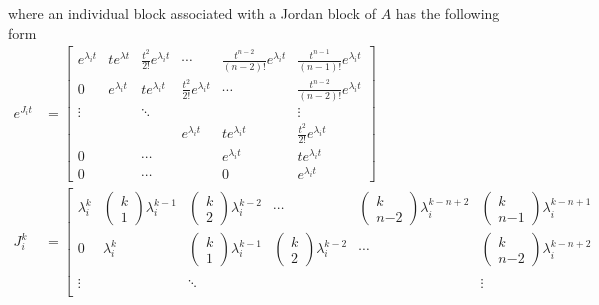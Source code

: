 \documentclass[twoside]{article}
\begin{document}
%
where an individual block associated with a Jordan block of $A$ has the following form
%
\begin{align*}
e^{J_i t} &= \left[  \begin{array}{cccccc} e^{\lambda_i t} & t e^{\lambda t} & \frac{t^2}{2 !} e^{\lambda_i t} 
& \cdots & \frac{t^{n-2}}{(n-2) !} e^{\lambda_i t}  & \frac{t^{n-1}}{(n-1) !} e^{\lambda_i t}
\\ 0 & e^{\lambda_i t} & t e^{\lambda_i t} & \frac{t^2}{2 !} e^{\lambda_i t} & \cdots  & \frac{t^{n-2}}{(n-2) !} e^{\lambda_i t}
\\  \vdots &  & \ddots &  &  & \vdots \\ 
& & & e^{\lambda_i t} & t e^{\lambda_i t} & \frac{t^2}{2 !} e^{\lambda_i t}
\\ 0 &  & \cdots  &  & e^{\lambda_i t} & t e^{\lambda_i t} \\
0 &  & \cdots &  & 0 & e^{\lambda_i t} \end{array} \right] 
\\
J_i^k &= \left[  \begin{array}{cccccc} \lambda_i^k & \begin{pmatrix} k \\ 1 \end{pmatrix} \lambda_i^{k-1} & \begin{pmatrix} k \\ 2 \end{pmatrix}  \lambda_i^{k-2} 
& \cdots & \begin{pmatrix} k \\ n\mathrm{-}2 \end{pmatrix} \lambda_i^{k-n+2} & \begin{pmatrix} k \\ n\mathrm{-}1 \end{pmatrix} \lambda_i^{k-n+1}
\\ 0 & \lambda_i^k & \begin{pmatrix} k \\ 1 \end{pmatrix}  \lambda_i^{k-1} & \begin{pmatrix} k \\ 2 \end{pmatrix} \lambda_i^{k-2} & \cdots  & \begin{pmatrix} k \\ n\mathrm{-}2 \end{pmatrix} \lambda_i^{k-n+2}
\\ 
\\  \vdots &  & \ddots &  &  & \vdots \\ 

\end{array}
\end{align*}
\end{document}
